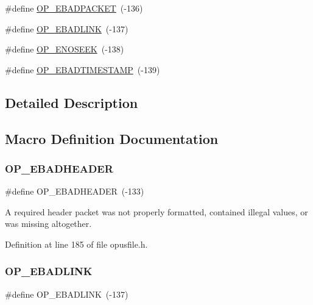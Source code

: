 \begin{DoxyCompactItemize}
\item 
\#define \mbox{\hyperlink{group__error__codes_gaa3fa0a3e6facc4f47924271e65bb21ff}{O\+P\+\_\+\+E\+B\+A\+D\+P\+A\+C\+K\+ET}}~(-\/136)
\item 
\#define \mbox{\hyperlink{group__error__codes_gaf7b58a439a471366e9eb5b8f2a8cd041}{O\+P\+\_\+\+E\+B\+A\+D\+L\+I\+NK}}~(-\/137)
\item 
\#define \mbox{\hyperlink{group__error__codes_gadd54f4d82cfabedb5963331fbe0bc99c}{O\+P\+\_\+\+E\+N\+O\+S\+E\+EK}}~(-\/138)
\item 
\#define \mbox{\hyperlink{group__error__codes_gaf82657fc888f1dcf2e0d8f066b8a6cc7}{O\+P\+\_\+\+E\+B\+A\+D\+T\+I\+M\+E\+S\+T\+A\+MP}}~(-\/139)
\end{DoxyCompactItemize}


\subsection{Detailed Description}


\subsection{Macro Definition Documentation}
\mbox{\label{group__error__codes_ga534f1b45c8733a2928434e482b38869f}} 
\subsubsection{\texorpdfstring{OP\_EBADHEADER}{OP\_EBADHEADER}}
{\footnotesize\ttfamily \#define O\+P\+\_\+\+E\+B\+A\+D\+H\+E\+A\+D\+ER~(-\/133)}

A required header packet was not properly formatted, contained illegal values, or was missing altogether. 

Definition at line 185 of file opusfile.\+h.

\mbox{\label{group__error__codes_gaf7b58a439a471366e9eb5b8f2a8cd041}} 
\subsubsection{\texorpdfstring{OP\_EBADLINK}{OP\_EBADLINK}}
{\footnotesize\ttfamily \#define O\+P\+\_\+\+E\+B\+A\+D\+L\+I\+NK~(-\/137)}

